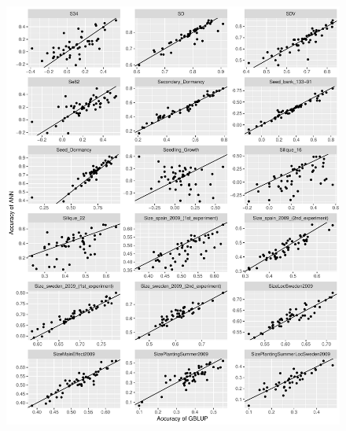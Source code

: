 \begin{figure}[H]
  \centering \includegraphics[height=1.05\textheight, width=1.1\textwidth]{Figures/cor_plots_6}
  \decoRule
 \label{fig:bla}
\end{figure}

